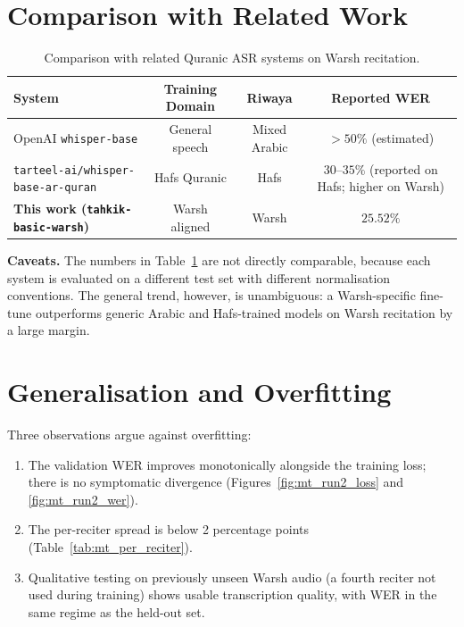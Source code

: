 \documentclass[12pt,a4paper]{report}
\begin{document}
\section{Comparison with Related Work}

\begin{table}[H]
  \centering
  \caption{Comparison with related Quranic ASR systems on Warsh
  recitation.}
  \label{tab:mt_related}
  \renewcommand{\arraystretch}{1.35}
  \begin{tabular}{lccc}
    \toprule
    \textbf{System} & \textbf{Training Domain} & \textbf{Riwaya} & \textbf{Reported WER} \\
    \midrule
    OpenAI \texttt{whisper-base}                & General speech       & Mixed Arabic & $> 50\%$ (estimated) \\
    \texttt{tarteel-ai/whisper-base-ar-quran}   & Hafs Quranic         & Hafs         & $30$--$35\%$ (reported on Hafs; higher on Warsh) \\
    \textbf{This work (\texttt{tahkik-basic-warsh})} & Warsh aligned    & Warsh        & $\mathbf{25.52\%}$ \\
    \bottomrule
  \end{tabular}
\end{table}

\textbf{Caveats.} The numbers in
Table~\ref{tab:mt_related} are not directly comparable, because each
system is evaluated on a different test set with different normalisation
conventions. The general trend, however, is unambiguous: a
Warsh-specific fine-tune outperforms generic Arabic and Hafs-trained
models on Warsh recitation by a large margin.

\section{Generalisation and Overfitting}

Three observations argue against overfitting:
\begin{enumerate}
  \item The validation WER improves monotonically alongside the
        training loss; there is no symptomatic divergence
        (Figures~\ref{fig:mt_run2_loss} and \ref{fig:mt_run2_wer}).
  \item The per-reciter spread is below 2 percentage points
        (Table~\ref{tab:mt_per_reciter}).
  \item Qualitative testing on previously unseen Warsh audio (a fourth
        reciter not used during training) shows usable transcription
        quality, with WER in the same regime as the held-out set.
\end{enumerate}
\end{document}
